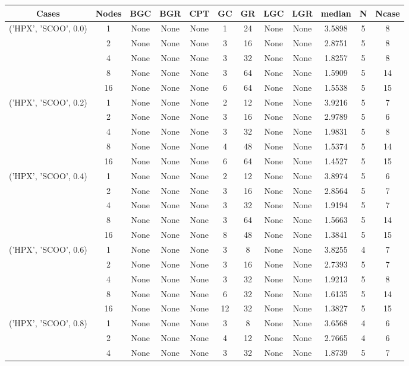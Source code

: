 \begin{tabular}{cccccccccccc}
\hline
Cases & Nodes& BGC& BGR& CPT& GC& GR& LGC& LGR& median & N & Ncase \\
\hline
\multirow{5}{*}{('HPX', 'SCOO', 0.0)}& 1& None& None& None& 1& 24& None& None& 3.5898& 5& 8\\
& 2& None& None& None& 3& 16& None& None& 2.8751& 5& 8\\
& 4& None& None& None& 3& 32& None& None& 1.8257& 5& 8\\
& 8& None& None& None& 3& 64& None& None& 1.5909& 5& 14\\
& 16& None& None& None& 6& 64& None& None& 1.5538& 5& 15\\
\hline
\multirow{5}{*}{('HPX', 'SCOO', 0.2)}& 1& None& None& None& 2& 12& None& None& 3.9216& 5& 7\\
& 2& None& None& None& 3& 16& None& None& 2.9789& 5& 6\\
& 4& None& None& None& 3& 32& None& None& 1.9831& 5& 8\\
& 8& None& None& None& 4& 48& None& None& 1.5374& 5& 14\\
& 16& None& None& None& 6& 64& None& None& 1.4527& 5& 15\\
\hline
\multirow{5}{*}{('HPX', 'SCOO', 0.4)}& 1& None& None& None& 2& 12& None& None& 3.8974& 5& 6\\
& 2& None& None& None& 3& 16& None& None& 2.8564& 5& 7\\
& 4& None& None& None& 3& 32& None& None& 1.9194& 5& 7\\
& 8& None& None& None& 3& 64& None& None& 1.5663& 5& 14\\
& 16& None& None& None& 8& 48& None& None& 1.3841& 5& 15\\
\hline
\multirow{5}{*}{('HPX', 'SCOO', 0.6)}& 1& None& None& None& 3& 8& None& None& 3.8255& 4& 7\\
& 2& None& None& None& 3& 16& None& None& 2.7393& 5& 7\\
& 4& None& None& None& 3& 32& None& None& 1.9213& 5& 8\\
& 8& None& None& None& 6& 32& None& None& 1.6135& 5& 14\\
& 16& None& None& None& 12& 32& None& None& 1.3827& 5& 15\\
\hline
\multirow{5}{*}{('HPX', 'SCOO', 0.8)}& 1& None& None& None& 3& 8& None& None& 3.6568& 4& 6\\
& 2& None& None& None& 4& 12& None& None& 2.7665& 4& 6\\
& 4& None& None& None& 3& 32& None& None& 1.8739& 5& 7\\

\end{tabular}
